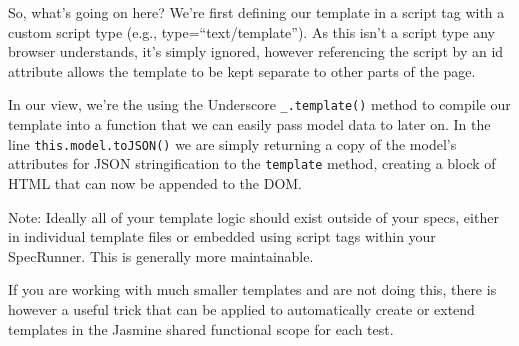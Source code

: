 \documentclass[9pt]{book}
\newenvironment{Shaded}{}{}
\newcommand{\KeywordTok}[1]{\textcolor[rgb]{0.00,0.44,0.13}{\textbf{{#1}}}}
\newcommand{\DataTypeTok}[1]{\textcolor[rgb]{0.56,0.13,0.00}{{#1}}}
\newcommand{\StringTok}[1]{\textcolor[rgb]{0.25,0.44,0.63}{{#1}}}
\newcommand{\CommentTok}[1]{\textcolor[rgb]{0.38,0.63,0.69}{\textit{{#1}}}}
\newcommand{\OtherTok}[1]{\textcolor[rgb]{0.00,0.44,0.13}{{#1}}}
\newcommand{\FunctionTok}[1]{\textcolor[rgb]{0.02,0.16,0.49}{{#1}}}
\newcommand{\NormalTok}[1]{{#1}}
\begin{document}
\begin{Shaded}
\end{Shaded}

So, what's going on here? We're first defining our template in a script
tag with a custom script type (e.g., type=``text/template''). As this
isn't a script type any browser understands, it's simply ignored,
however referencing the script by an id attribute allows the template to
be kept separate to other parts of the page.

In our view, we're the using the Underscore \texttt{\_.template()}
method to compile our template into a function that we can easily pass
model data to later on. In the line \texttt{this.model.toJSON()} we are
simply returning a copy of the model's attributes for JSON
stringification to the \texttt{template} method, creating a block of
HTML that can now be appended to the DOM.

Note: Ideally all of your template logic should exist outside of your
specs, either in individual template files or embedded using script tags
within your SpecRunner. This is generally more maintainable.

If you are working with much smaller templates and are not doing this,
there is however a useful trick that can be applied to automatically
create or extend templates in the Jasmine shared functional scope for
each test.
\end{document}
